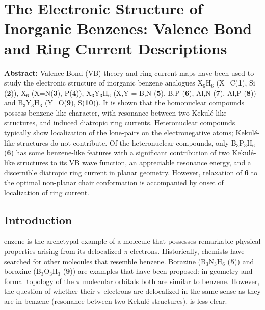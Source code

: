 \chapter{The Electronic Structure of Inorganic Benzenes: Valence Bond and Ring Current Descriptions}
\label{chap_inorganic}


\noindent\textbf{Abstract:}  Valence Bond (VB) theory and ring current maps have been used to study the electronic structure of inorganic benzene analogues X$_6$H$_6$ (X=C(\textbf{1}), Si (\textbf{2})),
X$_6$ (X=N(\textbf{3}), P(\textbf{4})), X$_3$Y$_3$H$_6$ (X,Y = B,N
(\textbf{5}), B,P (\textbf{6}), Al,N (\textbf{7}), Al,P (\textbf{8})) and
B$_3$Y$_3$H$_3$ (Y=O(\textbf{9}), S(\textbf{10})).
It is shown that the homonuclear compounds possess benzene-like character, with
resonance between two Kekul\'e-like structures, and induced diatropic
ring currents. Heteronuclear compounds typically show localization of the
lone-pairs on the electronegative atoms; Kekul\'e-like structures do not
contribute. Of the heteronuclear compounds, only B$_3$P$_3$H$_6$ (\textbf{6})
has some benzene-like features with a
significant contribution of two Kekul\'e-like structures to its VB wave
function, an appreciable resonance energy, and a discernible diatropic
ring current in planar geometry. However, relaxation of \textbf{6} to the optimal non-planar
chair conformation is accompanied by onset of localization of ring current.

\newpage

\section{Introduction}

\lettrine{}{}enzene is the archetypal example of a molecule that possesses remarkable
physical properties arising from its delocalized $\pi$ electrons.
Historically, chemists have searched for other molecules that resemble
benzene. Borazine (B$_3$N$_3$H$_6$ (\textbf{5})) and boroxine (B$_3$O$_3$H$_3$ (\textbf{9}))
are examples that have been proposed: in geometry and formal topology of the
$\pi$ molecular orbitals both are similar to benzene. However, the question of
whether their $\pi$ electrons are delocalized in the same sense as they are in
benzene (resonance between two Kekul\'e structures), is less clear. 

